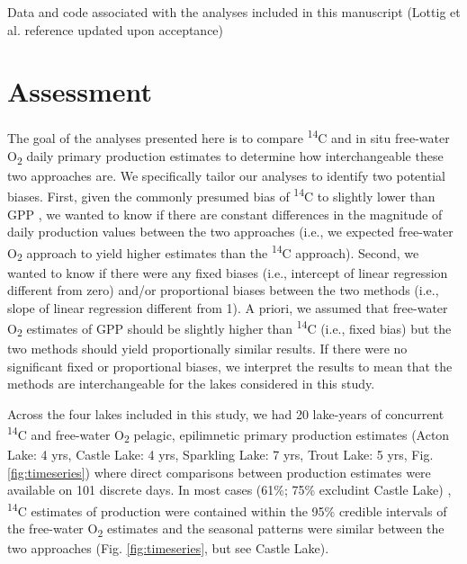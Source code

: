 \documentclass[12pt, oneside]{article}
\begin{document}
Data and code associated with the analyses included in this manuscript (Lottig et al. reference updated upon acceptance)

\section*{Assessment}

The goal of the analyses presented here is to compare \textsuperscript{14}C and in situ free-water O\textsubscript{2} daily primary production estimates to determine how interchangeable these two approaches are. We specifically tailor our analyses to identify two potential biases. First, given the commonly presumed  bias of \textsuperscript{14}C to slightly lower than GPP \citep{peterson_aquatic_1980,hall_measuring_2007}, we wanted to know if there are constant differences in the magnitude of daily production values between the two approaches (i.e., we expected free-water O\textsubscript{2} approach to yield higher estimates than the \textsuperscript{14}C approach). Second, we wanted to know if there were any fixed biases (i.e., intercept of linear regression different from zero) and/or proportional biases between the two methods (i.e., slope of linear regression different from 1). A priori, we assumed that free-water O\textsubscript{2} estimates of GPP should be slightly higher than \textsuperscript{14}C (i.e., fixed bias) but the two methods should yield proportionally similar results. If there were no significant fixed or proportional biases, we interpret the results to mean that the methods are interchangeable for the lakes considered in this study.

Across the four lakes included in this study, we had 20 lake-years of concurrent \textsuperscript{14}C and free-water O\textsubscript{2} pelagic, epilimnetic primary production estimates (Acton Lake: 4 yrs, Castle Lake: 4 yrs, Sparkling Lake: 7 yrs, Trout Lake: 5 yrs, Fig. \ref{fig:timeseries}) where direct comparisons between production estimates were available on 101 discrete days. In most cases (61\%; 75\% excludint Castle Lake) , \textsuperscript{14}C estimates of production were contained within the 95\% credible intervals of the free-water O\textsubscript{2} estimates and the seasonal patterns were similar between the two approaches (Fig. \ref{fig:timeseries}, but see Castle Lake). 
\end{document}
